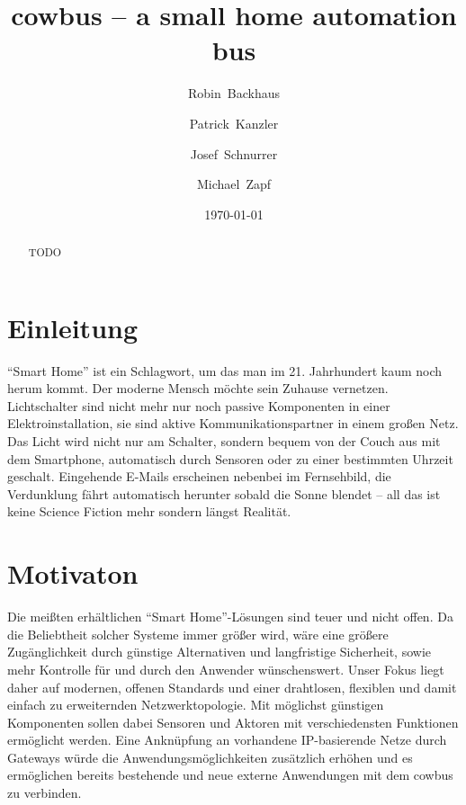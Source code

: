\documentclass{IEEEtran}
\begin{document}
\title{cowbus -- a small home automation bus}
\author{Robin~Backhaus \and Patrick~Kanzler \and Josef~Schnurrer \and Michael~Zapf}
\date{\today}



\maketitle

\begin{abstract}
    TODO
\end{abstract}


\section{Einleitung}

    \enquote{Smart Home} ist ein Schlagwort, um das man im 21. Jahrhundert
    kaum noch herum kommt. Der moderne Mensch möchte sein Zuhause vernetzen.
    Lichtschalter sind nicht mehr nur noch passive Komponenten in einer
    Elektroinstallation, sie sind aktive Kommunikationspartner in einem großen Netz.
    Das Licht wird nicht nur am Schalter, sondern bequem von der Couch aus mit dem
    Smartphone, automatisch durch Sensoren oder zu einer bestimmten Uhrzeit geschalt. 
    Eingehende E-Mails erscheinen nebenbei im Fernsehbild, die Verdunklung fährt 
    automatisch herunter sobald die Sonne blendet --
    all das ist keine Science Fiction mehr sondern längst Realität.

\section{Motivaton}

    Die meißten erhältlichen \enquote{Smart Home}-Lösungen sind teuer und nicht offen.
    Da die Beliebtheit solcher Systeme immer größer wird, wäre eine größere 
    Zugänglichkeit durch günstige Alternativen und langfristige Sicherheit, 
    sowie mehr Kontrolle für und durch den Anwender wünschenswert.
    Unser Fokus liegt daher auf modernen, offenen Standards und einer drahtlosen, 
    flexiblen und damit einfach zu erweiternden Netzwerktopologie.
    Mit möglichst günstigen Komponenten sollen dabei Sensoren und Aktoren 
    mit verschiedensten Funktionen ermöglicht werden.
    Eine Anknüpfung an vorhandene IP-basierende Netze durch Gateways würde die 
    Anwendungsmöglichkeiten zusätzlich erhöhen 
    und es ermöglichen bereits bestehende und neue externe Anwendungen mit dem 
    cowbus zu verbinden.
\end{document}
